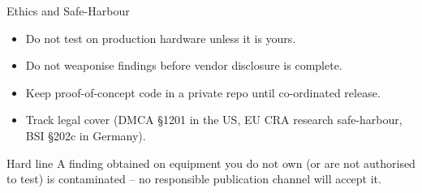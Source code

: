 \documentclass[aspectratio=169,11pt]{beamer}
\begin{document}
\begin{frame}{Ethics and Safe-Harbour}
\begin{itemize}
  \item Do not test on production hardware unless it is yours.
  \item Do not weaponise findings before vendor disclosure is complete.
  \item Keep proof-of-concept code in a private repo until co-ordinated release.
  \item Track legal cover (DMCA \S1201 in the US, EU CRA research safe-harbour, BSI \S202c in Germany).
\end{itemize}
\begin{warnbox}{Hard line}
A finding obtained on equipment you do not own (or are not authorised to test) is contaminated -- no responsible publication channel will accept it.
\end{warnbox}
\end{frame}
\end{document}
